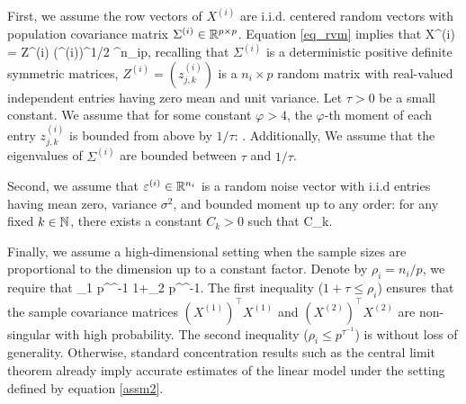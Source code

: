 First, we assume the row vectors of $X^{(i)}$ are i.i.d. centered random vectors with  population covariance matrix $\Sigma^{(i)} \in \mathbb{R}^{p \times p}$. Equation \eqref{eq_rvm} implies that
\be\label{XofZ}
    X^{(i)} = Z^{(i)} (\Sigma^{(i)})^{1/2} \in \real^{n_i\times p},
\ee
recalling that $\Sigma^{(i)}$ is a deterministic positive definite symmetric matrices, $Z^{(i)}=(z^{(i)}_{j,k})$ is a $n_i\times p$ random matrix with real-valued independent entries having zero mean and unit variance.
Let $\tau>0$ be a small constant.
We assume that for some constant $\varphi>4$, the $\varphi$-th moment of each entry $z^{(i)}_{j, k}$ is bounded from above by $1/\tau$:
\be \label{conditionA2}
  \le {}. %
\ee
Additionally, We assume that the eigenvalues of $\Sigma^{(i)}$ are bounded between $\tau$ and $1 / \tau$.
 
Second, we assume that $\varepsilon^{(i)} \in \mathbb{R}^{n_i}$ is a random noise vector with i.i.d entries having mean zero, variance $\sigma^2$, and bounded moment up to any order: for any fixed $k\in \mathbb{N}$, there exists a constant $C_k>0$ such that
\be\label{eq_highmoments}
 \le C_k.
\ee


Finally, we assume a high-dimensional setting when the sample sizes are proportional to the dimension up to a constant factor.
Denote by $\rho_i = n_i / p$, we require that
\be\label{assm2}
    \tau \le \rho_1 \le p^{\tau^{-1}}  1+\tau \le \rho_2 \le p^{\tau^{-1}}.
\ee
The first inequality ($1 + \tau \le \rho_i$) ensures that the sample covariance matrices $(X^{(1)})^\top X^{(1)}$ and $(X^{(2)})^\top X^{(2)}$ are non-singular with high probability.
The second inequality ($\rho_i \le p^{\tau^{-1}}$) is without loss of generality.
Otherwise, standard concentration results such as the central limit theorem already imply accurate estimates of the linear model under the setting defined by equation \eqref{assm2}.

